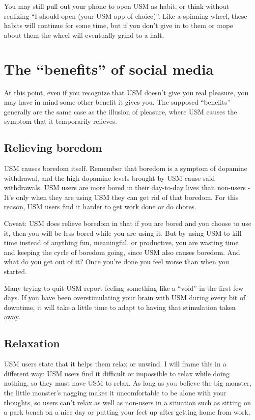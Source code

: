 \documentclass[
  openany]{book}
\begin{document}
You may still pull out your phone to open USM as habit, or think without realizing ``I should open (your USM app of choice)''. Like a spinning wheel, these habits will continue for some time, but if you don't give in to them or mope about them the wheel will eventually grind to a halt.

\chapter{The ``benefits'' of social media}\label{benefits}

At this point, even if you recognize that USM doesn't give you real pleasure, you may have in mind some other benefit it gives you. The supposed ``benefits'' generally are the same case as the illusion of pleasure, where USM causes the symptom that it temporarily relieves.

\section{Relieving boredom}\label{relieving-boredom}

USM causes boredom itself. Remember that boredom is a symptom of dopamine withdrawal, and the high dopamine levels brought by USM cause said withdrawals. USM users are more bored in their day-to-day lives than non-users - It's only when they are using USM they can get rid of that boredom. For this reason, USM users find it harder to get work done or do chores.

Caveat: USM does relieve boredom in that if you are bored and you choose to use it, then you will be less bored while you are using it. But by using USM to kill time instead of anything fun, meaningful, or productive, you are wasting time and keeping the cycle of boredom going, since USM also causes boredom. And what do you get out of it? Once you're done you feel worse than when you started.

Many trying to quit USM report feeling something like a ``void'' in the first few days. If you have been overstimulating your brain with USM during every bit of downtime, it will take a little time to adapt to having that stimulation taken away.

\section{Relaxation}\label{relaxation}

USM users state that it helps them relax or unwind. I will frame this in a different way: USM users find it difficult or impossible to relax while doing nothing, so they must have USM to relax. As long as you believe the big monster, the little monster's nagging makes it uncomfortable to be alone with your thoughts, so users can't relax as well as non-users in a situation such as sitting on a park bench on a nice day or putting your feet up after getting home from work.
\end{document}
